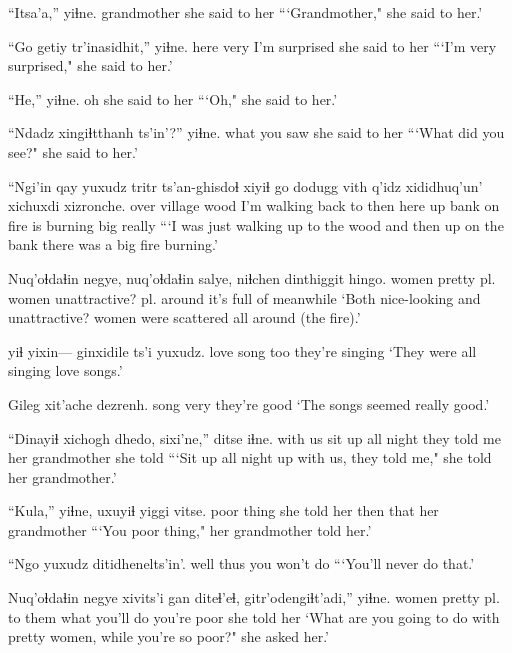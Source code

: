 \documentclass[12pt]{article}
\begin{document}
\gll ``Itsa'a,''  yiɬne.
grandmother     {she said to her}
\glt ```Grandmother," she said to her.'
\glend

\gll ``Go   getiy tr'inasidhit,''  yiɬne.
here very  {I'm surprised} {she said to her}
\glt ```I'm very surprised," she said to her.'
\glend

\gll ``He,'' yiɬne.
oh    {she said to her}
\glt ```Oh," she said to her.'
\glend

\gll ``Ndadz xingiɬtthanh ts'in'?'' yiɬne.
what  {you saw } {} {she said to her}
\glt ```What did you see?" she said to her.'
\glend

\gll ``Ngi'in qay yuxudz tritr ts'an-ghisdoɬ       xiyiɬ  go   dodugg vith q'idz xididhuq'un' xichuxdi xizronche.
over   village {}   wood  {I'm walking back to} then here up   bank on {fire is burning} big really
\glt ```I was just walking up to the wood and then up on the bank there was a big fire burning.'
\glend

\gll Nuq'oɬdaɬin negye, nuq'oɬdaɬin salye, niɬchen dinthiggit hingo.
women       {pretty pl.} women       {unattractive? pl.} around {it's full of}  meanwhile
\glt `Both nice-looking and unattractive? women were scattered all around (the fire).'
\glend

 yiɬ yixin--- ginxidile       ts'i yuxudz.
{love      song}  too {} {they're singing }
\glt `They were all singing love songs.'
\glend

\gll Gileg xit'ache dezrenh.
song  very    {they're good}
\glt `The songs seemed really good.'
\glend

\gll ``Dinayiɬ {xichogh dhedo,}    sixi'ne,''     ditse iɬne.
{with us} {sit up all night} {they told me} {her grandmother} {she told }
\glt ```Sit up all night up with us, they told me," she told her grandmother.'
\glend

\gll ``Kula,''       yiɬne,   uxuyiɬ    yiggi vitse.
{poor thing} {she told her} then that  {her grandmother}
\glt ```You poor thing," her grandmother told her.'
\glend

\gll ``Ngo  yuxudz {ditidhenelts'in'.}
well thus   {you won't do}
\glt ```You'll never do that.'
\glend
 
\gll Nuq'oɬdaɬin negye    xivits'i gan  diteɬ'eɬ, gitr'odengiɬt'adi,'' yiɬne.
women       {pretty pl.} {to them}  what {you'll do} {you're poor}         {she told her}
\glt `What are you going to do with pretty women, while you're so poor?" she asked her.'
\glend
\end{document}
